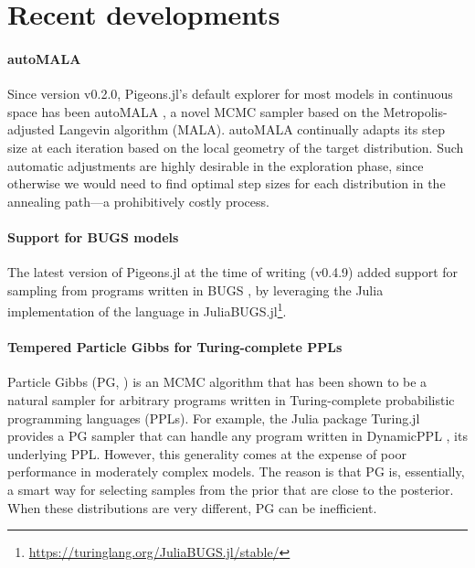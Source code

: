 \section{Recent developments}



\paragraph{autoMALA}
Since version v0.2.0, Pigeons.jl's default explorer for most models in continuous
space has been autoMALA \citep{biron2024automala}, a novel MCMC sampler
based on the Metropolis-adjusted Langevin algorithm (MALA). autoMALA continually
adapts its step size at each iteration based on the local geometry of the target
distribution. Such automatic adjustments are highly desirable in the exploration 
phase, since otherwise we would 
need to find optimal step sizes for each distribution in the annealing path---a 
prohibitively costly process.

\vspace{-1em}

\paragraph{Support for BUGS models}
The latest version of Pigeons.jl at the time of writing (v0.4.9) added support 
for sampling from programs written in BUGS \cite{lunn2000winbugs,lunn2009bugs,
lunn2013bugs}, by leveraging the Julia implementation of the 
language in JuliaBUGS.jl\footnote{\url{https://turinglang.org/JuliaBUGS.jl/stable/}}.

\vspace{-1em}

\paragraph{Tempered Particle Gibbs for Turing-complete PPLs}
Particle Gibbs (PG, \citealp{andrieu2010particle}) is an MCMC
algorithm that has been shown \citep{wood2014new} to be a natural sampler for
arbitrary programs written in Turing-complete probabilistic programming 
languages (PPLs). For example, the Julia package Turing.jl \citep{ge2018turing}
provides a PG sampler that can handle any program written in DynamicPPL
\citep{tarek2020dynamicppl}, its underlying PPL.
However, this generality comes at the expense of poor performance in moderately
complex models. The reason is that PG is, essentially, a smart 
way for selecting samples from the prior that are close to the posterior.
When these distributions are very different, PG can be inefficient.

